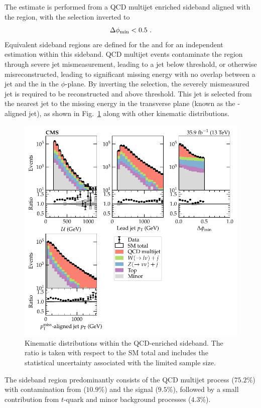 The estimate is performed from a QCD multijet enriched sideband aligned with the \metplusjets region, with the \mindphi selection inverted to
%
\begin{equation}
    \Delta\phi_{\mathrm{min}} < 0.5\ .
\end{equation}
%
Equivalent sideband regions are defined for the \muplusjets and \eleplusjets
for an independent \IWj estimation within this sideband. QCD multijet events
contaminate the \metplusjets region through severe jet mismeasurement, leading
to a jet below threshold, or otherwise misreconstructed, leading to
significant missing energy with no overlap between a jet and the \ptmiss in
the $\phi$-plane. By inverting the \mindphi selection, the severely
mismeasured jet is required to be reconstructed and above threshold. This jet
is selected from the nearest jet to the missing energy in the transverse plane
(known as the \ptmiss-aligned jet), as shown in
Fig.~\ref{fig:monojetqcd-nearest-jet-pt} along with other kinematic
distributions.
%
\begin{figure}
    \centering
    \includegraphics{chapters/042_backgrounds/images/monojetqcd_dists.pdf}
    \caption[QCD-enriched sideband kinematics.]{
        Kinematic distributions within the QCD-enriched sideband. The ratio is taken with respect to the SM total and includes the statistical uncertainty associated with the limited sample size.
    }
    \label{fig:monojetqcd-nearest-jet-pt}
\end{figure}
%
The sideband region predominantly consists of the QCD multijet process
($75.2\%$) with contamination from \IWlvj ($10.9\%$) and the signal \IZvvj
($9.5\%$), followed by a small contribution from $t$-quark and minor
background processes ($4.3\%$).

